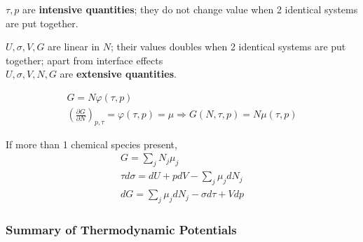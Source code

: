\documentclass[10pt]{amsart}
\begin{document}
\begin{multicols*}{2}
$\tau,p$ are \textbf{intensive quantities}; they do not change value when 2 identical systems are put together.  

$U,\sigma,V,G$ are linear in $N$; their values doubles when 2 identical systems are put together; apart from interface effects \\
$U,\sigma,V,N,G$ are \textbf{extensive quantities}.  


\[
\begin{gathered}
G = N\varphi(\tau,p) \\
\left( \frac{ \partial G}{ \partial N} \right)_{p,\tau} = \varphi(\tau,p) = \mu \Longrightarrow G(N,\tau,p) = N\mu(\tau,p)
\end{gathered}
\]

If more than 1 chemical species present, 
\begin{equation}\label{Eq:Gibbspotential}
  \boxed{ 
    \begin{gathered}
      G = \sum_j N_j \mu_j  \\
      \tau d\sigma = dU + pdV - \sum_j \mu_j dN_j \\
      dG = \sum_j \mu_j dN_j - \sigma d\tau + Vdp 
      \end{gathered}
    }
\end{equation}


\subsubsection{Summary of Thermodynamic Potentials}


\end{multicols*}
\end{document}
